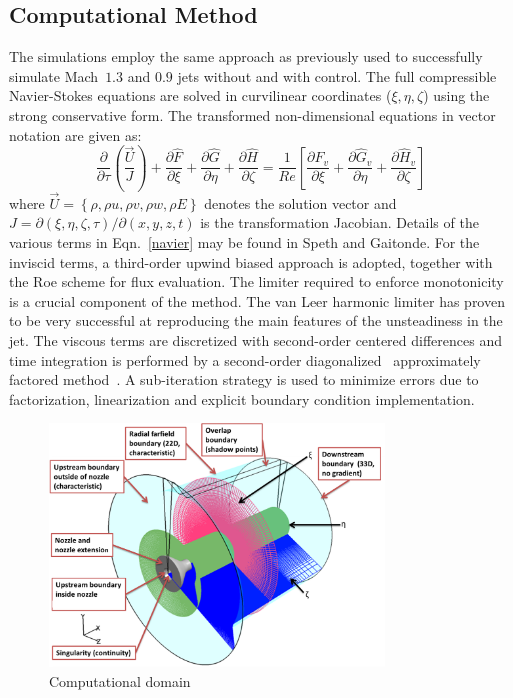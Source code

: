 \documentclass[english]{aiaa-tc}
\begin{document}
\subsection{Computational Method}\label{theo}
The simulations employ the same approach as previously used
to successfully simulate Mach~$1.3$ and $0.9$ jets without and with
control\cite{gdv2011-POF,SpethCF2013,speth2014}.  The full compressible
Navier-Stokes equations are solved in curvilinear coordinates
($\xi,\eta,\zeta$) using the
strong conservative form\cite{vm74-1,sjl78-1}. The transformed
non-dimensional equations in
vector notation are given as:
\begin{equation}
\frac{\partial}{\partial\tau}\left(\frac{\vec{U}}{J}\right)+\frac{\partial\hat{F}}{\partial\xi}+\frac{\partial\hat{G}}{\partial\eta}+\frac{\partial\hat{H}}{\partial\zeta}=\frac{1}{Re}\left[\frac{\partial\hat{F}_{v}}{\partial\xi}+\frac{\partial\hat{G}_{v}}{\partial\eta}+\frac{\partial\hat{H}_{v}}{\partial\zeta}\right]\label{navier}
\end{equation}
where $\vec{U}=\left\{ \rho,\rho u,\rho v,\rho w,\rho E\right\} $
denotes the solution vector and
$J=\partial\left(\xi,\eta,\zeta,\tau\right)/\partial\left(x,y,z,t\right)$
is the transformation Jacobian.  Details of the various terms in
Eqn.~\ref{navier} may be found in Speth and
Gaitonde\cite{speth2012b}.
For the inviscid terms, a third-order upwind biased approach is
adopted, together with the Roe scheme\cite{rpl81-1} for flux evaluation.  The
limiter required to enforce monotonicity is a crucial
component of the method.  The van Leer harmonic limiter\cite{lbv79-1}
has proven to be very successful at reproducing the main features of the
unsteadiness in the jet.  The viscous
terms are discretized with second-order centered differences and time
integration is performed by a second-order diagonalized~\cite{pth81-1}
approximately
factored method~\cite{br78-1}.  A sub-iteration
strategy is used to minimize errors due to factorization, linearization and
explicit boundary condition implementation.
\begin{figure}
\begin{center}
	\includegraphics[width=3.5in]{correctedM09grid.png}
\caption{Computational domain}\label{fig:M09Computationaldomain}
\end{center}
 \end{figure}
\end{document}
